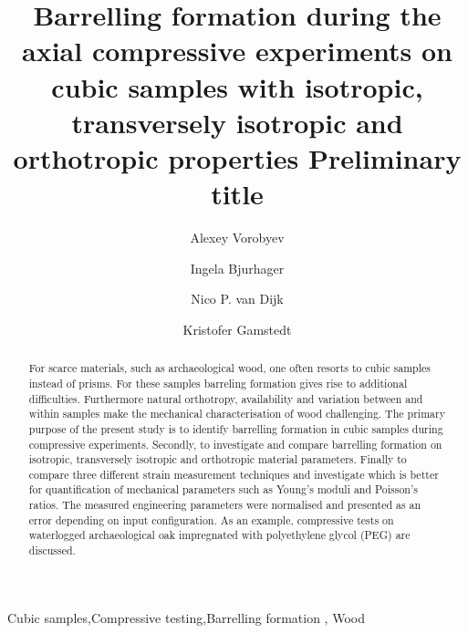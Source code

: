 \documentclass[review]{elsarticle}
\begin{document}
\doublespacing


\begin{frontmatter}

\title{Barrelling formation during the axial compressive experiments on cubic
samples with  isotropic, transversely isotropic and orthotropic properties
{\color{red} Preliminary title}}







\author{Alexey Vorobyev}


\author{Ingela Bjurhager}
\author{Nico P. van Dijk}
\author{Kristofer Gamstedt}

\address{Uppsala University, Division of Appplied Mechanics,
Uppsala, Sweden }



\begin{abstract}
For scarce materials, such as archaeological wood, one often resorts to cubic
samples instead of prisms. For these samples barreling formation gives rise to additional difficulties.
Furthermore natural orthotropy, availability and variation between and within
samples make the mechanical characterisation of wood  challenging. 
The primary purpose of the present study is to identify barrelling
formation in cubic samples during compressive experiments. Secondly, to investigate and
compare barrelling formation on isotropic, transversely 
isotropic and orthotropic material parameters. Finally to compare three 
different strain measurement techniques and investigate which is better for quantification 
of mechanical parameters such as Young's moduli and Poisson's ratios.
The measured engineering parameters were normalised and presented as an error
depending on input configuration.
As an example, compressive tests on waterlogged archaeological oak impregnated
with polyethylene glycol (PEG) are discussed.

\end{abstract}

\begin{keyword}
Cubic samples\sep Compressive testing\sep Barrelling formation \sep
Wood
\end{keyword}

\end{frontmatter}
\end{document}
